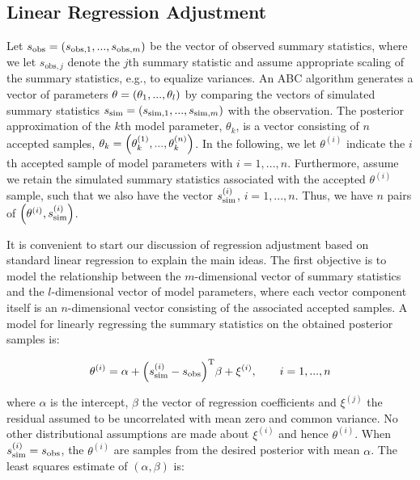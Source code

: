 \subsection{Linear Regression Adjustment}

Let $s_\mathrm{obs} = \qty(s_{\mathrm{obs}, 1}, ..., s_{\mathrm{obs}, m})$ be the vector of observed summary statistics, where we let $s_{\mathrm{obs}, j}$ denote the $j$th summary statistic and assume appropriate scaling of the summary statistics, e.g., to equalize variances. An ABC algorithm generates a vector of parameters $\theta = \qty(\theta_1, ..., \theta_l)$ by comparing the vectors of simulated summary statistics $s_\mathrm{sim} = \qty(s_{\mathrm{sim}, 1}, ..., s_{\mathrm{sim}, m})$ with the observation. The posterior approximation of the $k$th model parameter, $\theta_k$, is a vector consisting of $n$ accepted samples, $\theta_k = \qty(\theta_k^{(1)}, ..., \theta_k^{(n)})$. In the following, we let $\theta^{(i)}$ indicate the $i$th accepted sample of model parameters with $i=1, ..., n$. Furthermore, assume we retain the simulated summary statistics associated with the accepted $\theta^{(i)}$ sample, such that we also have the vector $s_\mathrm{sim}^{(i)}$, $i=1, ..., n$. Thus, we have $n$ pairs of $\qty(\theta^{(i)}, s_\mathrm{sim}^{(i)})$.

It is convenient to start our discussion of regression adjustment based on standard linear regression to explain the main ideas. The first objective is to model the relationship between the $m$-dimensional vector of summary statistics and the $l$-dimensional vector of model parameters, where each vector component itself is an $n$-dimensional vector consisting of the associated accepted samples. A model for linearly regressing the summary statistics on the obtained posterior samples is: 

\begin{equation}\label{eq:linreg_model}
    \theta^{(i)} = \alpha + \qty(s_\mathrm{sim}^{(i)} - s_\mathrm{obs})^\mathrm{T} \beta + \xi^{(i)}, \qquad i=1, ..., n
\end{equation} 

where $\alpha$ is the intercept, $\beta$ the vector of regression coefficients and $\xi^{(j)}$ the residual assumed to be uncorrelated with mean zero and common variance. No other distributional assumptions are made about $\xi^{(i)}$ and hence $\theta^{(i)}$. When $s_\mathrm{sim}^{(i)} = s_\mathrm{obs}$, the $\theta^{(i)}$ are samples from the desired posterior with mean $\alpha$. The least squares estimate of $(\alpha, \beta)$ is:


